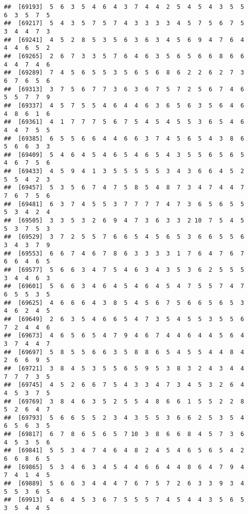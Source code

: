 \documentclass[
]{book}
\begin{document}
\begin{verbatim}
##  [69193]  5  6  3  5  4  6  4  3  7  4  4  2  5  4  5  4  3  5  5  6  3  5  7  5
##  [69217]  5  4  3  5  7  5  7  4  3  3  3  3  4  5  7  5  6  7  5  3  4  4  7  3
##  [69241]  4  5  2  8  5  3  5  6  3  6  3  4  5  6  9  4  7  6  4  4  4  6  5  2
##  [69265]  2  6  7  3  3  5  7  6  4  6  3  5  6  5  6  6  8  6  6  4  4  7  4  6
##  [69289]  7  4  5  6  5  5  3  5  6  5  6  8  6  2  2  6  2  7  3  6  7  6  5  6
##  [69313]  3  7  5  6  7  7  3  6  3  6  7  5  7  2  5  6  7  4  6  5  5  7  7  9
##  [69337]  4  5  7  5  5  4  6  4  4  6  3  6  5  6  3  5  6  4  6  4  8  6  1  6
##  [69361]  4  1  7  7  7  5  6  7  5  4  5  4  5  5  3  6  5  4  6  4  4  7  5  5
##  [69385]  6  5  5  6  6  4  4  6  6  3  7  4  5  6  5  4  3  8  6  5  6  6  3  3
##  [69409]  5  4  6  4  5  4  6  5  4  6  5  4  3  5  5  6  5  6  5  4  6  7  5  6
##  [69433]  4  5  9  4  1  3  5  5  5  5  5  3  4  3  6  6  4  5  2  5  5  4  2  3
##  [69457]  5  3  5  6  7  4  7  5  8  5  4  8  7  3  4  7  4  4  7  7  6  7  5  6
##  [69481]  6  3  7  4  5  5  3  7  7  7  7  4  7  3  6  5  6  5  5  5  3  4  2  4
##  [69505]  3  3  5  3  2  6  9  4  7  3  6  3  3  2 10  7  5  4  5  5  3  7  5  3
##  [69529]  3  7  2  5  5  7  6  6  5  4  5  6  5  3  6  6  5  5  6  3  4  3  7  9
##  [69553]  6  6  7  4  6  7  8  6  3  3  3  3  1  7  6  4  7  6  7  6  6  4  6  5
##  [69577]  5  6  6  3  4  7  5  4  6  3  4  3  5  3  6  2  5  5  5  3  4  4  6  3
##  [69601]  5  6  6  3  4  6  4  5  4  6  4  5  4  7  5  5  7  4  7  6  5  5  3  5
##  [69625]  4  6  6  6  4  3  8  5  4  5  6  7  5  6  6  5  6  5  3  4  6  2  4  5
##  [69649]  2  6  3  5  4  6  6  5  4  7  3  5  4  5  5  3  5  5  6  7  2  4  4  6
##  [69673]  4  6  5  6  5  4  7  9  4  6  7  4  4  6  4  4  5  6  4  3  7  4  4  7
##  [69697]  5  8  5  5  6  6  3  5  8  8  6  5  4  5  5  4  4  8  4  2  6  6  9  5
##  [69721]  3  8  4  5  3  5  5  6  5  9  5  3  8  3  2  4  3  4  4  7  7  7  3  5
##  [69745]  4  5  2  6  6  7  5  4  3  3  4  7  3  4  5  3  2  6  4  4  5  3  7  5
##  [69769]  3  8  4  6  3  5  2  5  5  4  8  6  6  1  5  5  2  2  8  5  2  6  4  7
##  [69793]  5  6  6  5  5  2  3  4  3  5  5  3  6  6  2  5  3  5  4  6  5  6  3  5
##  [69817]  6  7  8  6  5  6  5  7 10  3  8  6  6  8  4  5  7  3  6  4  5  3  5  6
##  [69841]  5  5  3  4  7  4  6  4  8  2  4  5  4  6  5  6  5  4  2  6  6  8  6  5
##  [69865]  5  3  4  6  3  4  5  4  4  6  6  4  4  8  6  4  7  9  4  7  4  1  4  5
##  [69889]  5  6  6  3  4  4  4  7  6  7  5  7  2  6  3  3  9  3  4  5  5  3  6  5
##  [69913]  4  6  4  5  3  6  7  5  5  5  7  4  5  4  4  3  5  6  5  3  5  4  4  5

\end{verbatim}
\end{document}
